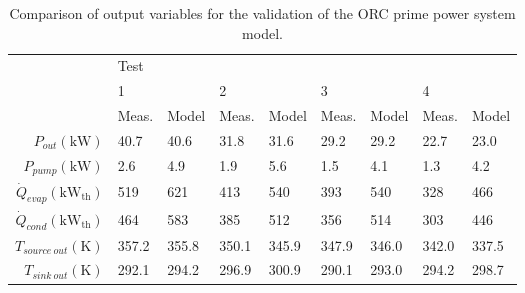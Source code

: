 \begin{table}[h]
	\centering
	\caption{Comparison of output variables for the validation of the ORC prime power system model.}
	\label{tab:verification_results01}
	\begin{tabular}{rllllllll}
		\toprule
		                                      & Test  &       &       &       &       &       &       &         \\ \cline{2-9}
		                                      & 1     &       & 2     &       & 3     &       & 4     &         \\
		                                      & Meas. & Model & Meas. & Model & Meas. & Model & Meas. & Model   \\ \midrule
		           $P_{out}(\si{\kilo\watt})$ & 40.7  & 40.6  & 31.8  & 31.6  & 29.2  & 29.2  & 22.7  & 23.0    \\
		          $P_{pump}(\si{\kilo\watt})$ & 2.6   & 4.9   & 1.9   & 5.6   & 1.5   & 4.1   & 1.3   & 4.2     \\
  $\dot{Q}_{evap}(\si{\kilo\watt}_\text{th})$ & 519   & 621   & 413   & 540   & 393   & 540   & 328   & 466     \\
  $\dot{Q}_{cond}(\si{\kilo\watt}_\text{th})$ & 464   & 583   & 385   & 512   & 356   & 514   & 303   & 446     \\
		      $T_{source\ out}(\si{\kelvin})$ & 357.2 & 355.8 & 350.1 & 345.9 & 347.9 & 346.0 & 342.0 & 337.5   \\
		        $T_{sink\ out}(\si{\kelvin})$ & 292.1 & 294.2 & 296.9 & 300.9 & 290.1 & 293.0 & 294.2 & 298.7   \\ \bottomrule
\end{tabular}
\end{table}

